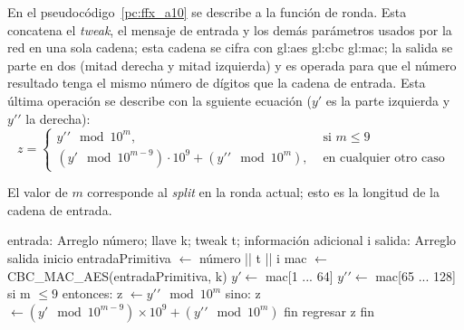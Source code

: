 En el pseudocódigo~\ref{pc:ffx_a10} se describe a la función de ronda.
Esta concatena el \textit{tweak}, el mensaje de entrada y los
demás parámetros usados por la red en una sola cadena; esta cadena se cifra con
\gls{gl:aes} \gls{gl:cbc} \gls{gl:mac}; la salida se parte en dos (mitad derecha
y mitad izquierda) y es operada para que el número resultado tenga el mismo
número de dígitos que la cadena de entrada. Esta última operación se describe
con la sguiente ecuación ($y\prime$ es la parte izquierda y $ y\prime\prime $
la derecha):
\begin{equation}
  z =
  \begin{cases}
    y\prime\prime \mod 10^{m}, & \text{ si } m \leq 9 \\
    (y\prime \mod 10^{m - 9}) \cdot 10^{9} + (y\prime\prime \mod 10^{m}),
    & \text{ en cualquier otro caso }
  \end{cases}
\end{equation}

El valor de $ m $ corresponde al \textit{split} en la ronda actual; esto es
la longitud de la cadena de entrada.

\begin{pseudocodigo}[%
    caption={\textit{FFX A10}, función de ronda},
    label={pc:ffx_a10}%
  ]
    entrada: Arreglo número; llave k; tweak t; información adicional i
    salida:  Arreglo salida
    inicio
      entradaPrimitiva $ \gets $ número || t || i
      mac $ \gets $ CBC_MAC_AES(entradaPrimitiva, k)
      $ y\prime \gets $ mac[1 ... 64]
      $ y\prime\prime \gets $ mac[65 ... 128]
      si m $ \leq 9 $ entonces:
        z $ \gets y\prime\prime \mod 10^m $
      sino:
        z $ \gets (y\prime \mod 10^{m - 9}) \times 10^9 + (y\prime\prime \mod 10^m)$
      fin
      regresar z
    fin
\end{pseudocodigo}
